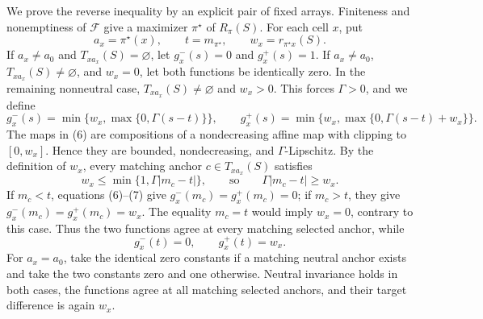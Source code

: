 We prove the reverse inequality by an explicit pair of fixed arrays.
Finiteness and nonemptiness of \(\mathcal F\) give a maximizer
\(\pi^\star\) of \(R_\pi(S)\).  For each cell \(x\), put
\[
a_x=\pi^\star(x),\qquad t=m_{\pi^\star},
\qquad w_x=r_{\pi^\star x}(S).
\]
If \(a_x\neq a_0\) and \(T_{x a_x}(S)=\varnothing\), let
\(g_x^-(s)=0\) and \(g_x^+(s)=1\).  If
\(a_x\neq a_0\), \(T_{x a_x}(S)\neq\varnothing\), and \(w_x=0\),
let both functions be identically zero.  In the remaining nonneutral case,
\(T_{x a_x}(S)\neq\varnothing\) and \(w_x>0\).  This forces
\(\Gamma>0\), and we define
\[
g_x^-(s)=\min\{w_x,\max\{0,\Gamma(s-t)\}\},
\qquad
g_x^+(s)=\min\{w_x,\max\{0,\Gamma(s-t)+w_x\}\}.                 \tag{6}
\]
The maps in (6) are compositions of a nondecreasing affine map with
clipping to \([0,w_x]\).  Hence they are bounded, nondecreasing, and
\(\Gamma\)-Lipschitz.  By the definition of \(w_x\), every matching
anchor \(c\in T_{x a_x}(S)\) satisfies
\[
w_x\leq \min\{1,\Gamma|m_c-t|\},
\qquad\text{so}\qquad \Gamma|m_c-t|\geq w_x.                    \tag{7}
\]
If \(m_c<t\), equations (6)--(7) give
\(g_x^-(m_c)=g_x^+(m_c)=0\); if \(m_c>t\), they give
\(g_x^-(m_c)=g_x^+(m_c)=w_x\).  The equality \(m_c=t\) would imply
\(w_x=0\), contrary to this case.  Thus the two functions agree at every
matching selected anchor, while
\[
g_x^-(t)=0,
\qquad
g_x^+(t)=w_x.                                                       \tag{8}
\]
For \(a_x=a_0\), take the identical zero constants if a matching neutral
anchor exists and take the two constants zero and one otherwise.  Neutral
invariance holds in both cases, the functions agree at all matching selected
anchors, and their target difference is again \(w_x\).

